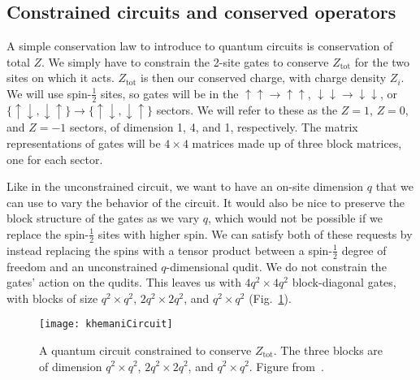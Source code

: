 \documentclass[a4paper,12pt]{article}
\renewcommand{\th}[1]{\frac{1}{#1}}
\newcommand{\tot}{\text{tot}}
\newcommand{\note}[1]{{\color{red}{#1}}}
\begin{document}
\note{In these ``physical systems," it is possible to have approximately conserved charges, i.e. on the localized side of a phase transition\dots}

\subsection{Constrained circuits and conserved operators} \label{sub:ccons}

\note{Conserved operator density, etc.}

\note{ballistic front, a power-law tail behind the front, and diffusively spreading charges near the origin}

A simple conservation law to introduce to quantum circuits is conservation of total $Z$. We simply have to constrain the 2-site gates to conserve $Z_\tot$ for the two sites on which it acts. $Z_\tot$ is then our conserved charge, with charge density $Z_i$.
We will use spin-$\th{2}$ sites, so gates will be in the $\uparrow\uparrow\to\uparrow\uparrow$, $\downarrow\downarrow\to\downarrow\downarrow$, or $\{\uparrow\downarrow,\downarrow\uparrow\}\to\{\uparrow\downarrow,\downarrow\uparrow\}$ sectors. We will refer to these as the $Z=1$, $Z=0$, and $Z=-1$ sectors, of dimension 1, 4, and 1, respectively. The matrix representations of gates will be $4\times4$ matrices made up of three block matrices, one for each sector.

Like in the unconstrained circuit, we want to have an on-site dimension $q$ that we can use to vary the behavior of the circuit. It would also be nice to preserve the block structure of the gates as we vary $q$, which would not be possible if we replace the spin-$\th{2}$ sites with higher spin. We can satisfy both of these requests by instead replacing the spins with a tensor product between a spin-$\th{2}$ degree of freedom and an unconstrained $q$-dimensional qudit. We do not constrain the gates' action on the qudits.
This leaves us with $4q^2\times4q^2$ block-diagonal gates, with blocks of size $q^2\times q^2$, $2q^2\times 2q^2$, and $q^2\times q^2$ (Fig.~\ref{fig:khemaniCircuit}).

\begin{figure}
	\centering
	\texttt{[image: khemaniCircuit]}
	\caption{A quantum circuit constrained to conserve $Z_\tot$. The three blocks are of dimension $q^2\times q^2$, $2q^2\times 2q^2$, and $q^2\times q^2$. Figure from~\cite{KhemaniOpSp}.}
	\label{fig:khemaniCircuit}
\end{figure}
\end{document}
